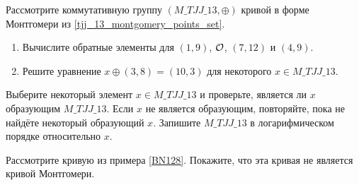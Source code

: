 \begin{exercise}
Рассмотрите коммутативную группу $(\mathit{M\_TJJ\_13},\oplus)$ кривой  в форме Монтгомери из \examplename{} \eqref{tjj_13_montgomery_points_set}. 
\begin{enumerate}
\item Вычислите обратные элементы для $(1,9)$, $\mathcal{O}$, $(7,12)$ и $(4,9)$.
\item Решите уравнение $x \oplus (3,8) = (10,3) $ для некоторого $x\in \mathit{M\_TJJ\_13}$.
\end{enumerate}
Выберите некоторый элемент $x\in \mathit{M\_TJJ\_13}$ и проверьте, является ли $x$ образующим $\mathit{M\_TJJ\_13}$. Если $x$ не является образующим, повторяйте, пока не найдёте некоторый образующий $x$. Запишите $\mathit{M\_TJJ\_13}$ в логарифмическом порядке относительно $x$.
\end{exercise}
\begin{exercise}
Рассмотрите кривую  из примера \ref{BN128}. Покажите, что эта кривая не является кривой Монтгомери.
\end{exercise}

